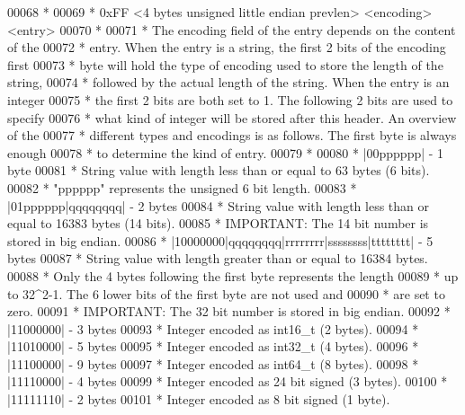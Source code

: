 \begin{DoxyCode}
00068 \textcolor{comment}{ *}
00069 \textcolor{comment}{ * 0xFF <4 bytes unsigned little endian prevlen> <encoding> <entry>}
00070 \textcolor{comment}{ *}
00071 \textcolor{comment}{ * The encoding field of the entry depends on the content of the}
00072 \textcolor{comment}{ * entry. When the entry is a string, the first 2 bits of the encoding first}
00073 \textcolor{comment}{ * byte will hold the type of encoding used to store the length of the string,}
00074 \textcolor{comment}{ * followed by the actual length of the string. When the entry is an integer}
00075 \textcolor{comment}{ * the first 2 bits are both set to 1. The following 2 bits are used to specify}
00076 \textcolor{comment}{ * what kind of integer will be stored after this header. An overview of the}
00077 \textcolor{comment}{ * different types and encodings is as follows. The first byte is always enough}
00078 \textcolor{comment}{ * to determine the kind of entry.}
00079 \textcolor{comment}{ *}
00080 \textcolor{comment}{ * |00pppppp| - 1 byte}
00081 \textcolor{comment}{ *      String value with length less than or equal to 63 bytes (6 bits).}
00082 \textcolor{comment}{ *      "pppppp" represents the unsigned 6 bit length.}
00083 \textcolor{comment}{ * |01pppppp|qqqqqqqq| - 2 bytes}
00084 \textcolor{comment}{ *      String value with length less than or equal to 16383 bytes (14 bits).}
00085 \textcolor{comment}{ *      IMPORTANT: The 14 bit number is stored in big endian.}
00086 \textcolor{comment}{ * |10000000|qqqqqqqq|rrrrrrrr|ssssssss|tttttttt| - 5 bytes}
00087 \textcolor{comment}{ *      String value with length greater than or equal to 16384 bytes.}
00088 \textcolor{comment}{ *      Only the 4 bytes following the first byte represents the length}
00089 \textcolor{comment}{ *      up to 32^2-1. The 6 lower bits of the first byte are not used and}
00090 \textcolor{comment}{ *      are set to zero.}
00091 \textcolor{comment}{ *      IMPORTANT: The 32 bit number is stored in big endian.}
00092 \textcolor{comment}{ * |11000000| - 3 bytes}
00093 \textcolor{comment}{ *      Integer encoded as int16\_t (2 bytes).}
00094 \textcolor{comment}{ * |11010000| - 5 bytes}
00095 \textcolor{comment}{ *      Integer encoded as int32\_t (4 bytes).}
00096 \textcolor{comment}{ * |11100000| - 9 bytes}
00097 \textcolor{comment}{ *      Integer encoded as int64\_t (8 bytes).}
00098 \textcolor{comment}{ * |11110000| - 4 bytes}
00099 \textcolor{comment}{ *      Integer encoded as 24 bit signed (3 bytes).}
00100 \textcolor{comment}{ * |11111110| - 2 bytes}
00101 \textcolor{comment}{ *      Integer encoded as 8 bit signed (1 byte).}

\end{DoxyCode}
